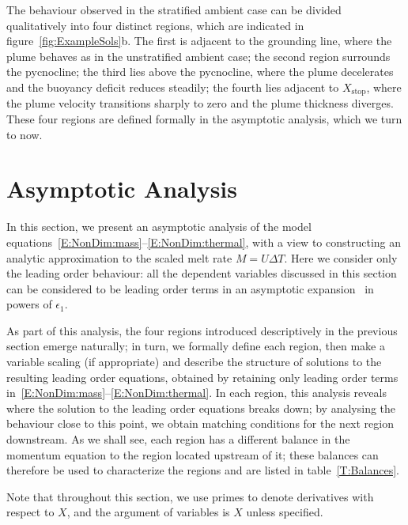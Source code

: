 \documentclass[openacc]{rsproca_new}%
\newcommand{\epsone}{\epsilon_{1}} %
\begin{document}
The behaviour observed in the stratified ambient case can be divided qualitatively into four distinct regions, which are indicated in figure~\ref{fig:ExampleSols}b. The first is adjacent to the grounding line, where the plume behaves as in the unstratified ambient case; the second region surrounds the pycnocline; the third lies above the pycnocline, where the plume decelerates and the buoyancy deficit reduces steadily; the fourth lies adjacent to $X_{\text{stop}}$, where the plume velocity transitions sharply to zero and the plume thickness diverges.  These four regions are defined formally in the asymptotic analysis, which we turn to now. 

\section{Asymptotic Analysis}\label{S:Asymptotics}
In this section, we present an asymptotic analysis of the model equations~\eqref{E:NonDim:mass}--\eqref{E:NonDim:thermal}, with a view to constructing an analytic approximation to the scaled melt rate $M = U \Delta T$. Here we consider only the leading order behaviour: all the dependent variables discussed in this section can be considered to be leading order terms in an asymptotic expansion~\citep{HinchPerturbationMethods} in powers of $\epsone$. 

As part of this analysis, the four regions introduced descriptively in the previous section emerge naturally; in turn, we formally define each region, then make a variable scaling (if appropriate) and describe the structure of solutions to the resulting leading order equations, obtained by retaining only leading order terms in~\eqref{E:NonDim:mass}--\eqref{E:NonDim:thermal}. In each region, this analysis reveals where the solution to the leading order equations breaks down; by analysing the behaviour close to this point, we obtain matching conditions for the next region downstream. As we shall see, each region has a different balance in the momentum equation to the region located upstream of it; these balances can therefore be used to characterize the regions and are listed in table~\ref{T:Balances}. 

Note that throughout this section, we use primes to denote derivatives with respect to $X$, and the argument of variables is $X$ unless specified.
\end{document}
